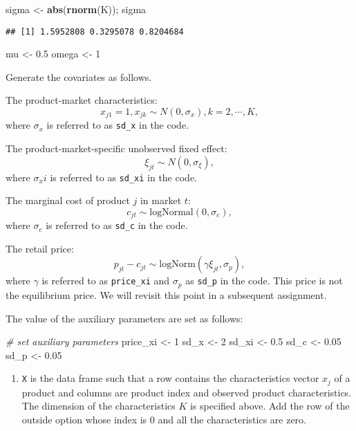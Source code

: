 \documentclass[
]{book}
\newenvironment{Shaded}{\begin{snugshade}}{\end{snugshade}}
\newcommand{\CommentTok}[1]{\textcolor[rgb]{0.56,0.35,0.01}{\textit{#1}}}
\newcommand{\DecValTok}[1]{\textcolor[rgb]{0.00,0.00,0.81}{#1}}
\newcommand{\FloatTok}[1]{\textcolor[rgb]{0.00,0.00,0.81}{#1}}
\newcommand{\KeywordTok}[1]{\textcolor[rgb]{0.13,0.29,0.53}{\textbf{#1}}}
\newcommand{\NormalTok}[1]{#1}
\newcommand{\StringTok}[1]{\textcolor[rgb]{0.31,0.60,0.02}{#1}}
\providecommand{\tightlist}{%
  \setlength{\itemsep}{0pt}\setlength{\parskip}{0pt}}
\begin{document}
\begin{Shaded}
\begin{Highlighting}[]
\NormalTok{sigma <-}\StringTok{ }\KeywordTok{abs}\NormalTok{(}\KeywordTok{rnorm}\NormalTok{(K)); sigma}
\end{Highlighting}
\end{Shaded}

\begin{verbatim}
## [1] 1.5952808 0.3295078 0.8204684
\end{verbatim}

\begin{Shaded}
\begin{Highlighting}[]
\NormalTok{mu <-}\StringTok{ }\FloatTok{0.5}
\NormalTok{omega <-}\StringTok{ }\DecValTok{1}
\end{Highlighting}
\end{Shaded}

Generate the covariates as follows.

The product-market characteristics:
\[
x_{j1} = 1, x_{jk} \sim N(0, \sigma_x), k = 2, \cdots, K,
\]
where \(\sigma_x\) is referred to as \texttt{sd\_x} in the code.

The product-market-specific unobserved fixed effect:
\[
\xi_{jt} \sim N(0, \sigma_\xi),
\]
where \(\sigma_xi\) is referred to as \texttt{sd\_xi} in the code.

The marginal cost of product \(j\) in market \(t\):
\[
c_{jt} \sim \text{logNormal}(0, \sigma_c),
\]
where \(\sigma_c\) is referred to as \texttt{sd\_c} in the code.

The retail price:
\[
p_{jt} - c_{jt} \sim \text{logNorm}(\gamma \xi_{jt}, \sigma_p),
\]
where \(\gamma\) is referred to as \texttt{price\_xi} and \(\sigma_p\) as \texttt{sd\_p} in the code. This price is not the equilibrium price. We will revisit this point in a subsequent assignment.

The value of the auxiliary parameters are set as follows:

\begin{Shaded}
\begin{Highlighting}[]
\CommentTok{# set auxiliary parameters}
\NormalTok{price_xi <-}\StringTok{ }\DecValTok{1}
\NormalTok{sd_x <-}\StringTok{ }\DecValTok{2}
\NormalTok{sd_xi <-}\StringTok{ }\FloatTok{0.5}
\NormalTok{sd_c <-}\StringTok{ }\FloatTok{0.05}
\NormalTok{sd_p <-}\StringTok{ }\FloatTok{0.05}
\end{Highlighting}
\end{Shaded}

\begin{enumerate}
\def\labelenumi{\arabic{enumi}.}
\setcounter{enumi}{1}
\tightlist
\item
  \texttt{X} is the data frame such that a row contains the characteristics vector \(x_{j}\) of a product and columns are product index and observed product characteristics. The dimension of the characteristics \(K\) is specified above. Add the row of the outside option whose index is \(0\) and all the characteristics are zero.
\end{enumerate}
\end{document}
